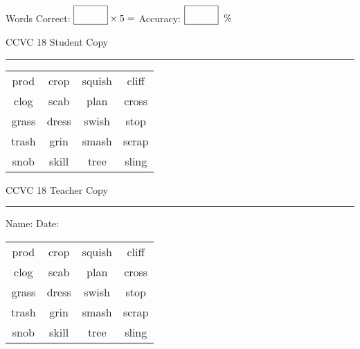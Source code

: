 \documentclass{memoir}
\begin{document}
\small

Words Correct: $\fbox{\phantom{\huge 100}} \times 5 = $ Accuracy: $\fbox{\phantom{\huge 100}}\;\; \%$ 

\vfill

\newpage


\footnotesize \noindent
CCVC 18 \hfill Student Copy
\smallskip
\hrule

\Large

\setlength{\tabcolsep}{14pt}
\def\arraystretch{3}

{\selectfont


\begin{vplace}[0.5]
\begin{center}
\begin{tabular}{cccc}
prod & crop & squish & cliff            \\
clog & scab & plan & cross \\
grass                    & dress & swish & stop \\
trash & grin     & smash & scrap \\
snob & skill & tree & sling \\
\end{tabular}
\end{center}
\end{vplace}

}

\newpage

\footnotesize \noindent
CCVC 18 \hfill Teacher Copy
\smallskip
\hrule

\small

\vfill

\noindent
Name: \underline{\hspace{1.75in}} \hfill Date: \underline{\hspace{1in}}

\Large

{\selectfont


\begin{vplace}[0.5]
\begin{center}
\begin{tabular}{cccc}
prod & crop & squish & cliff            \\
clog & scab & plan & cross \\
grass                    & dress & swish & stop \\
trash & grin     & smash & scrap \\
snob & skill & tree & sling \\
\end{tabular}
\end{center}
\end{vplace}



}
\end{document}
